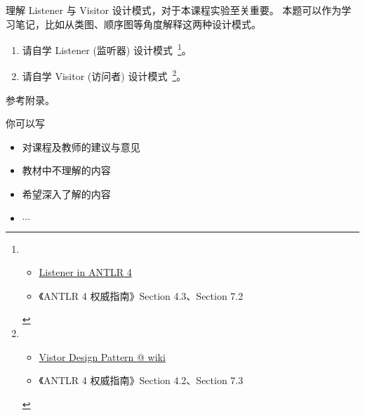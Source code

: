 \documentclass[a4paper, justified]{tufte-handout}
\begin{document}
\begin{problem}
  理解 Listener 与 Visitor 设计模式，对于本课程实验至关重要。
  本题可以作为学习笔记，比如从类图、顺序图等角度解释这两种设计模式。
  \begin{enumerate}[(1)]
    \item 请自学 Listener (监听器) 设计模式~\footnote[]{
      \begin{itemize}
        \item \href{https://github.com/antlr/antlr4/blob/master/doc/listeners.md}{Listener in ANTLR 4}
        \item 《ANTLR 4 权威指南》Section 4.3、Section 7.2
      \end{itemize}
    }。
    \item 请自学 Visitor (访问者) 设计模式~\footnote{
      \begin{itemize}
        \item \href{https://en.wikipedia.org/wiki/Visitor_pattern}{Vistor Design Pattern @ wiki}
        \item 《ANTLR 4 权威指南》Section 4.2、Section 7.3
      \end{itemize}
    }。
  \end{enumerate}
\end{problem}
\begin{solution}
	参考附录。
\end{solution}


\beginfb

你可以写
\begin{itemize}
  \item 对课程及教师的建议与意见
  \item 教材中不理解的内容
  \item 希望深入了解的内容
  \item $\cdots$
\end{itemize}
\end{document}

